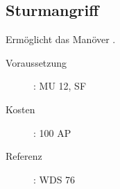 \subsection{Sturmangriff}
\label{sf.sturmangriff}
Ermöglicht das Manöver .
\begin{description}
    \item[Voraussetzung]:
        MU 12, SF 
    \item [Kosten]:
        100 AP
    \item [Referenz]:
        WDS 76
\end{description}

